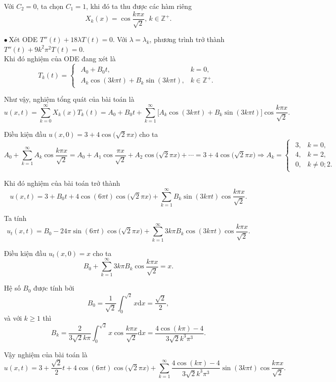 \documentclass[10pt, a4paper]{article}
\begin{document}
	Với $C_2=0$, ta chọn $C_1=1$, khi đó ta thu được các hàm riêng $$X_k(x)=\cos\frac{k\pi x}{\sqrt2},\,k\in\mathbb Z^+.$$
	
	$\bullet~$Xét ODE $T''(t)+18\lambda T(t)=0$. Với $\lambda=\lambda_k$, phương trình trở thành $T''(t)+9k^2\pi^2T(t)=0$.\\
	
	Khi đó nghiệm của ODE đang xét là $$T_k(t)=\begin{cases}
		\begin{array}{ll}
			A_0+B_0t, & k=0, \\
			A_k\cos(3k\pi t)+B_k\sin(3k\pi t), & k\in\mathbb Z^+.
		\end{array}
	\end{cases}$$
	
	Như vậy, nghiệm tổng quát của bài toán là $$u(x,t)=\sum_{k=0}^\infty X_k(x)T_k(t)=A_0+B_0t+\sum_{k=1}^\infty\big[A_k\cos(3k\pi t)+B_k\sin(3k\pi t)\big]\cos\frac{k\pi x}{\sqrt2}.$$
	
	Điều kiện đầu $u(x,0)=3+4\cos\big(\sqrt 2\pi x\big)$ cho ta $$A_0+\sum_{k=1}^\infty A_k\cos\frac{k\pi x}{\sqrt2}=A_0+A_1\cos\frac{\pi x}{\sqrt2}+A_2\cos\big(\sqrt2\pi x)+\cdots=3+4\cos\big(\sqrt 2\pi x\big)\Rightarrow A_k=\begin{cases}
		\begin{array}{ll}
			3, & k=0, \\
			4, & k=2, \\
			0, & k\ne0;2.
		\end{array}
	\end{cases}$$
	
	Khi đó nghiệm của bài toán trở thành $$u(x,t)=3+B_0t+4\cos(6\pi t)\cos\big(\sqrt 2\pi x\big)+\sum_{k=1}^\infty B_k\sin(3k\pi t)\cos\frac{k\pi x}{\sqrt2}.$$
	
	Ta tính $$u_t(x,t)=B_0-24\pi\sin(6\pi t)\cos\big(\sqrt 2\pi x\big)+\sum_{k=1}^\infty3k\pi B_k\cos(3k\pi t)\cos\frac{k\pi x}{\sqrt2}.$$
	
	Điều kiện đầu $u_t(x,0)=x$ cho ta $$B_0+\sum_{k=1}^\infty3k\pi B_k\cos\frac{k\pi x}{\sqrt2}=x.$$
	
	Hệ số $B_0$ được tính bởi $$B_0=\frac{1}{\sqrt2}\int_0^{\sqrt2}x\mathrm dx=\frac{\sqrt2}{2},$$
	và với $k\ge1$ thì $$B_k=\frac{2}{3\sqrt2k\pi}\int_0^{\sqrt2}x\cos\frac{k\pi x}{\sqrt2}\mathrm dx=\frac{4\cos(k\pi)-4}{3\sqrt2k^3\pi^3}.$$
	
	Vậy nghiệm của bài toán là $$u(x,t)=3+\frac{\sqrt2}{2}t+4\cos(6\pi t)\cos\big(\sqrt 2\pi x\big)+\sum_{k=1}^\infty\frac{4\cos(k\pi)-4}{3\sqrt2k^3\pi^3}\sin(3k\pi t)\cos\frac{k\pi x}{\sqrt2}.$$
\end{document}
